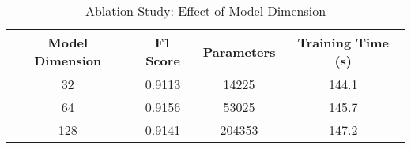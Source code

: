 \begin{table}[h]
\centering
\caption{Ablation Study: Effect of Model Dimension}
\label{tab:dimension_ablation}
\begin{tabular}{cccc}
\hline
Model Dimension & F1 Score & Parameters & Training Time (s) \\
\hline
32 & 0.9113 & 14225 & 144.1 \\
64 & 0.9156 & 53025 & 145.7 \\
128 & 0.9141 & 204353 & 147.2 \\
\hline
\end{tabular}
\end{table}
